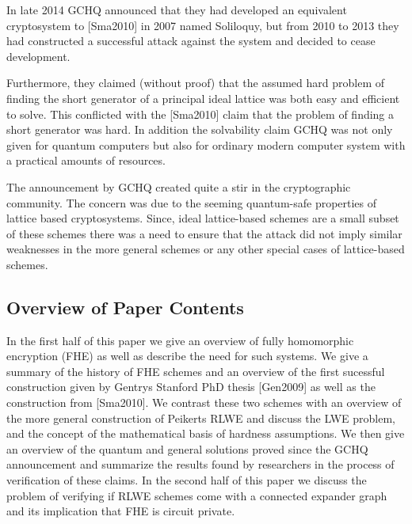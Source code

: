 In late 2014 GCHQ announced that they had developed an equivalent
cryptosystem to [Sma2010] in 2007 named Soliloquy, but from 2010 to
2013 they had constructed a successful attack against the system and
decided to cease development.

Furthermore, they claimed (without proof) that the assumed hard
problem of finding the short generator of a principal ideal lattice was
both easy and efficient to solve. This conflicted with the [Sma2010]
claim that the problem of finding a short generator was hard. In
addition the solvability claim GCHQ was not only given for quantum
computers but also for ordinary modern computer system with a practical
amounts of resources.

The announcement by GCHQ created quite a stir in the cryptographic
community. The concern was due to the seeming quantum-safe properties
of lattice based cryptosystems. Since, ideal lattice-based schemes are
a small subset of these schemes there was a need to ensure that the
attack did not imply similar weaknesses in the more general schemes or
any other special cases of lattice-based schemes.

\subsection{Overview of Paper Contents}

In the first half of this paper we give an overview of fully
homomorphic encryption (FHE) as well as describe the need for such
systems.
We give a summary of the history of FHE schemes and an overview of
the first sucessful construction given by Gentrys Stanford PhD thesis
[Gen2009] as well as the construction from [Sma2010].
We contrast these two schemes with an overview of the more general
construction of Peikerts RLWE and discuss the LWE problem, and the
concept of the mathematical basis of hardness assumptions.
We then give an overview of the quantum and general solutions proved
since the GCHQ announcement and summarize the results found by
researchers in the process of verification of these claims.
In the second half of this paper we discuss the problem of verifying
if RLWE schemes come with a connected expander graph and its
implication that FHE is circuit private.

